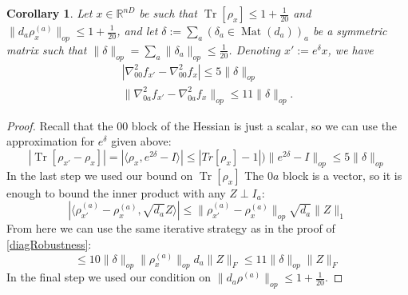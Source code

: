\documentclass[aos]{imsart}
\newtheorem{corollary}[theorem]{Corollary}
\theoremstyle{definition}
\numberwithin{equation}{section}
\DeclareMathOperator{\Mat}{Mat}
\DeclareMathOperator{\tr}{Tr}
\newcommand{\R}{{\mathbb{R}}}
\newcommand{\samp}{x}
\newcommand{\AR}[1]{{\color{orange}[AR: #1]}}
\begin{document}
\begin{appendix}
\begin{corollary} \label{constantRobustness}
Let $\samp \in \R^{nD}$ be such that $\tr[\rho_{\samp}] \leq 1 + \frac{1}{20}$ and $\|d_{a} \rho_{\samp}^{(a)}\|_{op} \leq 1 + \frac{1}{20}$, and let $\delta := \sum_{a} (\delta_{a} \in \Mat(d_{a}))_{a}$ be a symmetric matrix such that $\|\delta\|_{op} = \sum_{a} \|\delta_{a}\|_{op} \leq \frac{1}{20}$. Denoting $\samp' := e^{\delta} \samp$, we have
\begin{align*} |\nabla^{2}_{00} f_{\samp'} - \nabla^{2}_{00} f_{\samp}| \leq 5 \|\delta\|_{op}  \\
 \|\nabla^{2}_{0a} f_{\samp'} - \nabla^{2}_{0a} f_{\samp}\|_{op} \leq 11 \|\delta\|_{op} .  \end{align*}
\end{corollary}
\begin{proof}
Recall that the $00$ block of the Hessian is just a scalar, so we can use the approximation for $e^{\delta}$ given above:
\[ |\tr[\rho_{\samp'} - \rho_{\samp}]| = |\langle \rho_{\samp}, e^{2\delta} - I \rangle| \leq |Tr[\rho_{\samp}]-1|) \|e^{2 \delta} - I\|_{op} \leq 5 \|\delta\|_{op}     \]
In the last step we used our bound on $\tr[\rho_{\samp}]$
The $0a$ block is a vector, so it is enough to bound the inner product with any $Z \perp I_{a}$:
\[ |\langle \rho_{\samp'}^{(a)} - \rho_{\samp}^{(a)}, \sqrt{d_{a}} Z \rangle| \leq \|\rho_{\samp'}^{(a)} - \rho_{\samp}^{(a)}\|_{op} \sqrt{d_{a}} \|Z\|_{1} \]
From here we can use the same iterative strategy as in the proof of \cref{diagRobustness}:
\[ \leq 10 \|\delta\|_{op} \|\rho^{(a)}_{\samp}\|_{op} d_{a} \|Z\|_{F} \leq 11 \|\delta\|_{op} \|Z\|_{F}   \]
In the final step we used our condition on $\|d_{a} \rho^{(a)}\|_{op} \leq 1 + \frac{1}{20}$.
\end{proof}


\end{appendix}
\end{document}
